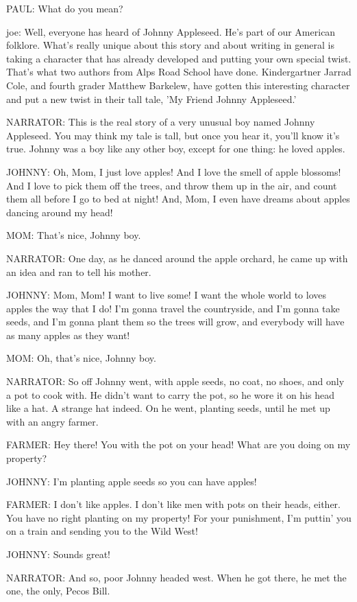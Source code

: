 PAUL:
What do you mean?

joe:
Well, everyone has heard of Johnny Appleseed.
He's part of our American folklore.
What's really unique about this story and about writing in general is taking a character that has already developed and putting your own special twist.
That's what two authors from Alps Road School have done.
Kindergartner Jarrad Cole, and fourth grader Matthew Barkelew, have gotten this interesting character and put a new twist in their tall tale, 'My Friend Johnny Appleseed.'

NARRATOR:
This is the real story of a very unusual boy named Johnny Appleseed.
You may think my tale is tall, but once you hear it, you'll know it's true.
Johnny was a boy like any other boy, except for one thing: he loved apples.

JOHNNY:
Oh, Mom, I just love apples!
And I love the smell of apple blossoms!
And I love to pick them off the trees, and throw them up in the air, and count them all before I go to bed at night!
And, Mom, I even have dreams about apples dancing around my head!

MOM:
That's nice, Johnny boy.

NARRATOR:
One day, as he danced around the apple orchard, he came up with an idea and ran to tell his mother.

JOHNNY:
Mom, Mom!
I want to live some!
I want the whole world to loves apples the way that I do!
I'm gonna travel the countryside, and I'm gonna take seeds, and I'm gonna plant them so the trees will grow, and everybody will have as many apples as they want!

MOM:
Oh, that's nice, Johnny boy.

NARRATOR:
So off Johnny went, with apple seeds, no coat, no shoes, and only a pot to cook with.
He didn't want to carry the pot, so he wore it on his head like a hat.
A strange hat indeed.
On he went, planting seeds, until he met up with an angry farmer.

FARMER:
Hey there!
You with the pot on your head!
What are you doing on my property?

JOHNNY:
I'm planting apple seeds so you can have apples!

FARMER:
I don't like apples.
I don't like men with pots on their heads, either.
You have no right planting on my property!
For your punishment, I'm puttin' you on a train and sending you to the Wild West!

JOHNNY:
Sounds great!

NARRATOR:
And so, poor Johnny headed west.
When he got there, he met the one, the only, Pecos Bill.

